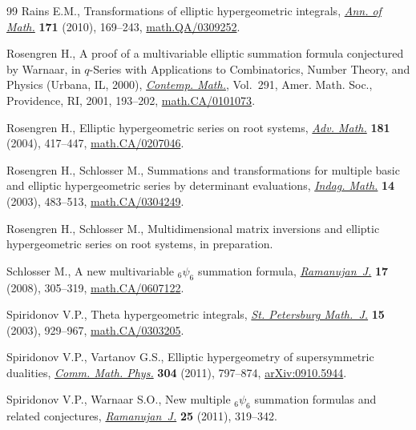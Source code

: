 \documentclass[pdftex]{sigma}
\numberwithin{equation}{section}
\begin{document}
\begin{thebibliography}{99}
Rains E.M., Transformations of elliptic hypergeometric integrals, \href{https://doi.org/10.4007/annals.2010.171.169}{\textit{Ann.
 of Math.}} \textbf{171} (2010), 169--243, \href{http://arxiv.org/abs/math.QA/0309252}{math.QA/0309252}.

Rosengren H., A proof of a multivariable elliptic summation formula conjectured
 by {W}arnaar, in {$q$}-Series with Applications to Combinatorics, Number
 Theory, and Physics ({U}rbana, {IL}, 2000), \href{https://doi.org/10.1090/conm/291/04903}{\textit{Contemp. Math.}}, Vol.~291, Amer. Math. Soc., Providence, RI, 2001, 193--202, \href{http://arxiv.org/abs/math.CA/0101073}{math.CA/0101073}.

Rosengren H., Elliptic hypergeometric series on root systems, \href{https://doi.org/10.1016/S0001-8708(03)00071-9}{\textit{Adv.
 Math.}} \textbf{181} (2004), 417--447, \href{http://arxiv.org/abs/math.CA/0207046}{math.CA/0207046}.


Rosengren H., Schlosser M., Summations and transformations for multiple basic
 and elliptic hypergeometric series by determinant evaluations, \href{https://doi.org/10.1016/S0019-3577(03)90058-9}{\textit{Indag.
 Math.}} \textbf{14} (2003), 483--513, \href{http://arxiv.org/abs/math.CA/0304249}{math.CA/0304249}.

Rosengren H., Schlosser M., Multidimensional matrix inversions and elliptic
 hypergeometric series on root systems, in preparation.

Schlosser M., A new multivariable {$_6\psi_6$} summation formula,
 \href{https://doi.org/10.1007/s11139-007-9017-9}{\textit{Ramanujan~J.}} \textbf{17} (2008), 305--319, \href{http://arxiv.org/abs/math.CA/0607122}{math.CA/0607122}.

Spiridonov V.P., Theta hypergeometric integrals, \href{https://doi.org/10.1090/S1061-0022-04-00839-8}{\textit{St. Petersburg
 Math.~J.}} \textbf{15} (2003), 929--967, \href{http://arxiv.org/abs/math.CA/0303205}{math.CA/0303205}.

Spiridonov V.P., Vartanov G.S., Elliptic hypergeometry of supersymmetric
 dualities, \href{https://doi.org/10.1007/s00220-011-1218-9}{\textit{Comm. Math. Phys.}} \textbf{304} (2011), 797--874,
 \href{http://arxiv.org/abs/0910.5944}{arXiv:0910.5944}.

Spiridonov V.P., Warnaar S.O., New multiple {$_6\psi_6$} summation formulas and
 related conjectures, \href{https://doi.org/10.1007/s11139-011-9310-5}{\textit{Ramanujan~J.}} \textbf{25} (2011), 319--342.


\end{thebibliography}
\end{document}
